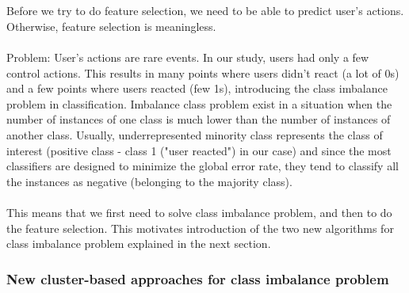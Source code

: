 \documentclass[a4paper]{article}
\begin{document}
\\\\
Before we try to do feature selection, we need to be able to predict user's actions. Otherwise, feature selection is meaningless. 
\\\\
Problem: User's actions are rare events. In our study, users had only a few control actions. This results in many points where users didn't react (a lot of 0s) and a few points where users reacted (few 1s), introducing the class imbalance problem in classification. Imbalance class problem exist in a situation when the number of instances of one class is much lower than the number of instances of another class.  Usually, underrepresented minority class represents the class of interest (positive class - class 1 ("user reacted") in our case) and since the most classifiers are designed to minimize the global error rate, they tend to classify all the instances as negative (belonging to the majority class).
\\\\
\color{red} This means that we first need to solve class imbalance problem, and then to do the feature selection. This motivates introduction of the two new algorithms for class imbalance problem explained in the next section.

\color{black}
\subsubsection{New cluster-based approaches for class imbalance problem}\label{sec:NewAlgos}
\end{document}
